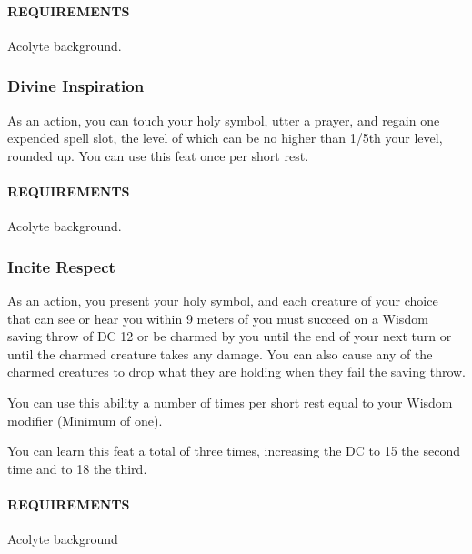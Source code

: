         \paragraph{REQUIREMENTS} Acolyte background.

    \subsubsection{Divine Inspiration} \label{feat::divineinspiration}
        As an action, you can touch your holy symbol, utter a prayer, and regain one expended spell slot, the level of which can be no higher than 1/5th your level, rounded up.
        You can use this feat once per short rest.
        \paragraph{REQUIREMENTS} Acolyte background.

    \subsubsection{Incite Respect} \label{feat::inciterespect}
        As an action, you present your holy symbol, and each creature of your choice that can see or hear you within 9 meters of you must succeed on a Wisdom saving throw of DC 12 or be charmed by you until the end of your next turn or until the charmed creature takes any damage.
        You can also cause any of the charmed creatures to drop what they are holding when they fail the saving throw.

        You can use this ability a number of times per short rest equal to your Wisdom modifier (Minimum of one).

        You can learn this feat a total of three times, increasing the DC to 15 the second time and to 18 the third.
        \paragraph{REQUIREMENTS} Acolyte background

